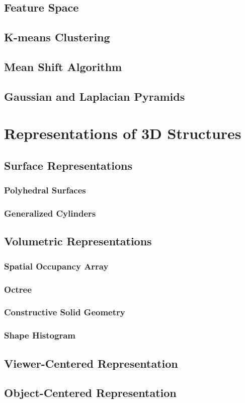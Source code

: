 \documentclass{article}
\begin{document}
\begin{multicols}{2}
\subsection{Feature Space}
\subsection{K-means Clustering}
\subsection{Mean Shift Algorithm}
\subsection{Gaussian and Laplacian Pyramids}

\section{Representations of 3D Structures}
\subsection{Surface Representations}
\subsubsection{Polyhedral Surfaces}
\subsubsection{Generalized Cylinders}
\subsection{Volumetric Representations}
\subsubsection{Spatial Occupancy Array}
\subsubsection{Octree}
\subsubsection{Constructive Solid Geometry}
\subsubsection{Shape Histogram}
\subsection{Viewer-Centered Representation}
\subsection{Object-Centered Representation}

\end{multicols}
\end{document}
